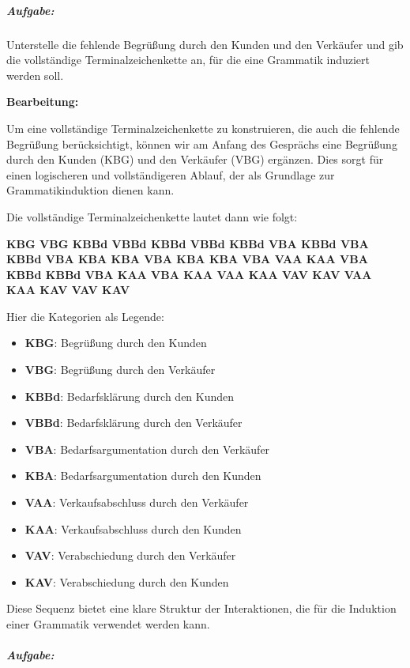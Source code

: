 \documentclass[
]{article}
\begin{document}
\subparagraph{\texorpdfstring{\textbf{Aufgabe:}}{Aufgabe:}}\label{aufgabe-1}

Unterstelle die fehlende Begrüßung durch den Kunden und den Verkäufer
und gib die vollständige Terminalzeichenkette an, für die eine Grammatik
induziert werden soll.

\textbf{Bearbeitung:}

Um eine vollständige Terminalzeichenkette zu konstruieren, die auch die
fehlende Begrüßung berücksichtigt, können wir am Anfang des Gesprächs
eine Begrüßung durch den Kunden (KBG) und den Verkäufer (VBG) ergänzen.
Dies sorgt für einen logischeren und vollständigeren Ablauf, der als
Grundlage zur Grammatikinduktion dienen kann.

Die vollständige Terminalzeichenkette lautet dann wie folgt:

\textbf{KBG VBG KBBd VBBd KBBd VBBd KBBd VBA KBBd VBA KBBd VBA KBA KBA
VBA KBA KBA VBA VAA KAA VBA KBBd KBBd VBA KAA VBA KAA VAA KAA VAV KAV
VAA KAA KAV VAV KAV}

Hier die Kategorien als Legende:

\begin{itemize}
\item
  \textbf{KBG}: Begrüßung durch den Kunden
\item
  \textbf{VBG}: Begrüßung durch den Verkäufer
\item
  \textbf{KBBd}: Bedarfsklärung durch den Kunden
\item
  \textbf{VBBd}: Bedarfsklärung durch den Verkäufer
\item
  \textbf{VBA}: Bedarfsargumentation durch den Verkäufer
\item
  \textbf{KBA}: Bedarfsargumentation durch den Kunden
\item
  \textbf{VAA}: Verkaufsabschluss durch den Verkäufer
\item
  \textbf{KAA}: Verkaufsabschluss durch den Kunden
\item
  \textbf{VAV}: Verabschiedung durch den Verkäufer
\item
  \textbf{KAV}: Verabschiedung durch den Kunden
\end{itemize}

Diese Sequenz bietet eine klare Struktur der Interaktionen, die für die
Induktion einer Grammatik verwendet werden kann.

\subparagraph{\texorpdfstring{\textbf{Aufgabe:}}{Aufgabe:}}\label{aufgabe-2}
\end{document}
